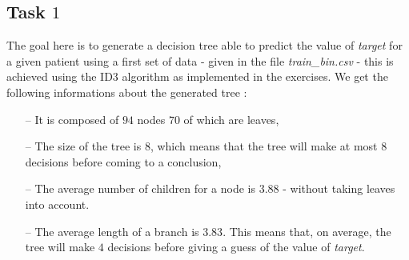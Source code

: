 \documentclass[9pt]{extarticle}
\DeclarePairedDelimiter\ceil{\lceil}{\rceil}
\begin{document}
\subsection{Task $1$}
	The goal here is to generate a decision tree able to predict the value of \emph{target} for a given patient using a first set of data - given in the file \emph{train\_bin.csv} - this is achieved using the ID3 algorithm as implemented in the exercises. We get the following informations about the generated tree :
	\begin{itemize}[topsep=0pt,itemsep=0pt,partopsep=0pt, parsep=0pt]
		\item[--] It is composed of $94$ nodes $70$ of which are leaves,
		\item[--] The size of the tree is 8, which means that the tree will make at most $8$ decisions before coming to a conclusion,
		\item[--] The average number of children for a node is $3.88$ - without taking leaves into account.
		\item[--] The average length of a branch is $3.83$.  This means that, on average, the tree will make $4$ decisions before giving a guess of the value of \emph{target}.
	\end{itemize}
\end{document}
